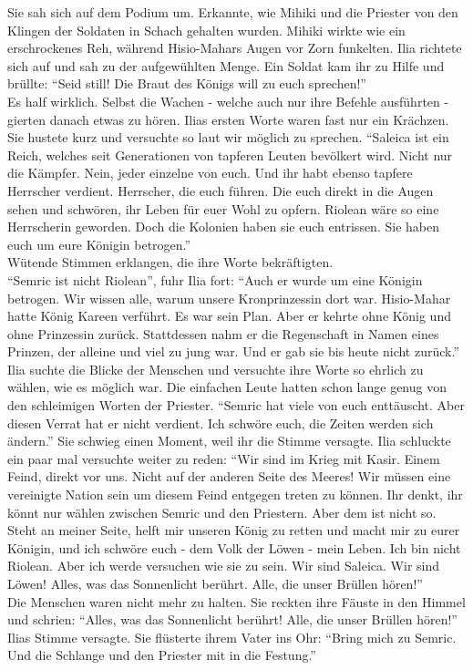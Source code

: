 Sie sah sich auf dem Podium um. Erkannte, wie Mihiki und die Priester von den Klingen der Soldaten 
in Schach gehalten wurden. Mihiki wirkte wie ein erschrockenes Reh, während Hisio-Mahars Augen vor 
Zorn funkelten. Ilia richtete sich auf und sah zu der aufgewühlten Menge. Ein Soldat kam ihr zu 
Hilfe und brüllte: ``Seid still! Die Braut des Königs will zu euch sprechen!''\\
Es half wirklich. Selbst die Wachen - welche auch nur ihre Befehle ausführten - gierten danach 
etwas zu hören. Ilias ersten Worte waren fast nur ein Krächzen. Sie hustete kurz und versuchte so 
laut wir möglich zu sprechen. ``Saleica ist ein Reich, welches seit Generationen von tapferen 
Leuten bevölkert wird. Nicht nur die Kämpfer. Nein, jeder einzelne von euch. Und ihr habt ebenso 
tapfere Herrscher verdient. Herrscher, die euch führen. Die euch direkt in die Augen sehen und 
schwören, ihr Leben für euer Wohl zu opfern. Riolean wäre so eine Herrscherin geworden. Doch die 
Kolonien haben sie euch entrissen. Sie haben euch um eure Königin betrogen.''\\
Wütende Stimmen erklangen, die ihre Worte bekräftigten.\\
``Semric ist nicht Riolean'', fuhr Ilia fort: ``Auch er wurde um eine Königin betrogen. Wir wissen 
alle, warum unsere Kronprinzessin dort war. Hisio-Mahar hatte König Kareen verführt. Es war sein 
Plan. Aber er kehrte ohne König und ohne Prinzessin zurück. Stattdessen nahm er die Regenschaft in 
Namen eines Prinzen, der alleine und viel zu jung war. Und er gab sie bis heute nicht zurück.''\\
Ilia suchte die Blicke der Menschen und versuchte ihre Worte so ehrlich zu wählen, wie es möglich 
war. Die einfachen Leute hatten schon lange genug von den schleimigen Worten der Priester. ``Semric 
hat viele von euch enttäuscht. Aber diesen Verrat hat er nicht verdient. Ich schwöre euch, die 
Zeiten werden sich ändern.'' Sie schwieg einen Moment, weil ihr die Stimme versagte. Ilia 
schluckte ein paar mal versuchte weiter zu reden: ``Wir sind im Krieg mit Kasir. Einem Feind, 
direkt vor uns. Nicht auf der anderen Seite des Meeres! Wir müssen eine vereinigte Nation sein um 
diesem Feind entgegen treten zu können. Ihr denkt, ihr könnt nur wählen zwischen Semric und den 
Priestern. Aber dem ist nicht so. Steht an meiner Seite, helft mir unseren König zu retten und 
macht mir zu eurer Königin, und ich schwöre euch - dem Volk der Löwen - mein Leben. Ich bin nicht 
Riolean. Aber ich werde versuchen wie sie zu sein. Wir sind Saleica. Wir sind Löwen! Alles, was das 
Sonnenlicht berührt. Alle, die unser Brüllen hören!''\\
Die Menschen waren nicht mehr zu halten. Sie reckten ihre Fäuste in den Himmel und schrien: 
``Alles, was das Sonnenlicht berührt! Alle, die unser Brüllen hören!''\\
Ilias Stimme versagte. Sie flüsterte ihrem Vater ins Ohr: ``Bring mich zu Semric. Und die Schlange 
und den Priester mit in die Festung.''\\


